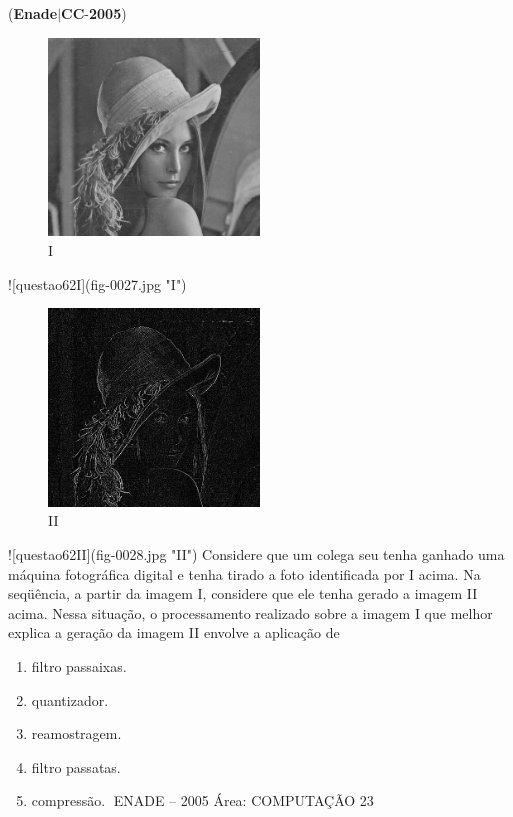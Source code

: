 \documentclass{exam}
\begin{document}
\begin{questions}
\question (\textbf{Enade}$|$\textbf{CC}-\textbf{2005}) \begin{figure}[H]
	\begin{center}
		\includegraphics[width=0.5\textwidth]{CIENCIA_DA_COMPUTACAO_Prova2005-utf8_figuras/fig-0027.jpg}
		\caption{I}
	\end{center}
\end{figure}
![questao62I](fig-0027.jpg "I")
\begin{figure}[H]
	\begin{center}
		\includegraphics[width=0.5\textwidth]{CIENCIA_DA_COMPUTACAO_Prova2005-utf8_figuras/fig-0028.jpg}
		\caption{II}
	\end{center}
\end{figure}
![questao62II](fig-0028.jpg "II")
Considere que um colega seu tenha ganhado uma máquina
fotográfica digital e tenha tirado a foto identificada por I acima.
Na seqüência, a partir da imagem I, considere que ele tenha
gerado a imagem II acima. Nessa situação, o processamento
realizado sobre a imagem I que melhor explica a geração da
imagem II envolve a aplicação de
	\begin{enumerate}[label=\alph*)]
		\item  filtro passaixas.
		\item  quantizador.
		\item  reamostragem.
		\item  filtro passatas.
		\item  compressão.
ENADE – 2005 Área: COMPUTAÇÃO 23


\end{enumerate}
\end{questions}
\end{document}
